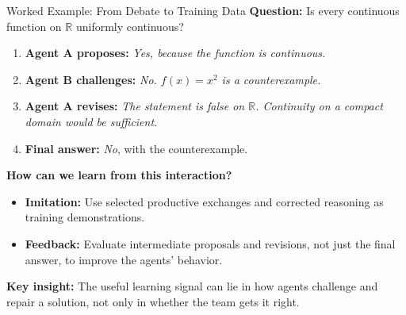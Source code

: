 \documentclass[aspectratio=169]{beamer}
\begin{document}
\begin{frame}{Worked Example: From Debate to Training Data}
\small
\textbf{Question:} Is every continuous function on $\mathbb{R}$ uniformly continuous?

\vspace{0.1cm}
\begin{enumerate}
    \item \textbf{Agent A proposes:} \emph{Yes, because the function is continuous.}
    \item \textbf{Agent B challenges:} \emph{No. $f(x)=x^2$ is a counterexample.}
    \item \textbf{Agent A revises:} \emph{The statement is false on $\mathbb{R}$. Continuity on a compact domain would be sufficient.}
    \item \textbf{Final answer:} \emph{No}, with the counterexample.
\end{enumerate}

\vspace{0.15cm}
\textbf{How can we learn from this interaction?}
\begin{itemize}
    \item \textbf{Imitation:} Use selected productive exchanges and corrected reasoning as training demonstrations.
    \item \textbf{Feedback:} Evaluate intermediate proposals and revisions, not just the final answer, to improve the agents' behavior.
\end{itemize}

\vspace{0.15cm}
\textbf{Key insight:} The useful learning signal can lie in how agents challenge and repair a solution, not only in whether the team gets it right.

\end{frame}
\end{document}
